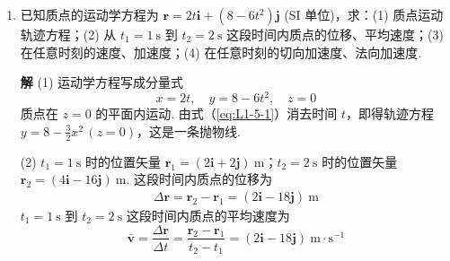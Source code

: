 \begin{enumerate}
	(3) 制动开始后 $t = 20 \mathrm{\ s}$ 时飞轮的角速度为
	\begin{equation}\label{eq:L1-4-3}
		\omega = \omega_0 + \alpha t = \left[ 50\pi + (-\pi) \times 20 \right] \mathrm{\ rad \cdot s^{-1}} = 30\pi \mathrm{\ rad \cdot s^{-1}}
	\end{equation}
	
	(4) $t = 20 \mathrm{\ s}$ 时刻飞轮边缘上任一点的速率为
	\begin{align*}
		v = R\omega = 0.60 \times 30\pi \mathrm{\ m \cdot s^{-1}} = 18\pi \mathrm{\ m \cdot s^{-1}} = 56.5 \mathrm{\ m \cdot s^{-1}}
	\end{align*}
	$t = 20 \mathrm{\ s}$ 时刻飞轮边缘上任一点的切向加速度和法向加速度分别为
	\begin{align*}
		a_t = R\alpha = 0.60 \times (-\pi) \mathrm{\ m \cdot s^{-2}} = -0.60\pi \mathrm{\ m \cdot s^{-2}} = -1.88 \mathrm{\ m \cdot s^{-2}}
	\end{align*}
	\begin{align*}
		a_n = R\omega^2 = 0.60 \times (30\pi)^2 \mathrm{\ m \cdot s^{-2}} = 5.33 \times 10^3 \mathrm{\ m \cdot s^{-2}}
	\end{align*}
	$t = 20 \mathrm{\ s}$ 时刻飞轮边缘上任一点的加速度大小为
	\begin{equation}\label{eq:L1-4-4}
		a = \sqrt{a_t^2 + a_n^2} = 5.33 \times 10^3 \mathrm{\ m \cdot s^{-2}}
	\end{equation}
	
	\vspace{2em}
	
	\item [\textbf{L1-5}]
	\setcounter{equation}{0}
	\renewcommand{\theHequation}{L1-5.\arabic{equation}}
	\quad 已知质点的运动学方程为 $\boldsymbol{r} = 2t\boldsymbol{i} + (8 - 6t^2)\boldsymbol{j}$ (SI 单位)，求：(1) 质点运动轨迹方程；(2) 从 $t_1 = 1\mathrm{\ s}$ 到 $t_2 = 2\mathrm{\ s}$ 这段时间内质点的位移、平均速度；(3) 在任意时刻的速度、加速度；(4) 在任意时刻的切向加速度、法向加速度.
	
	\textbf{解} \quad (1) 运动学方程写成分量式
	\begin{equation}\label{eq:L1-5-1}
		x = 2t, \quad y = 8 - 6t^2, \quad z = 0
	\end{equation}
	质点在 $z = 0$ 的平面内运动. 由式（\ref{eq:L1-5-1}）消去时间 $t$，即得轨迹方程 $y = 8 - \frac{3}{2}x^2 \, (z=0)$，这是一条抛物线.
	
	(2) $t_1 = 1\mathrm{\ s}$ 时的位置矢量 $\boldsymbol{r}_1 = (2\boldsymbol{i} + 2\boldsymbol{j})\mathrm{\ m}$；$t_2 = 2\mathrm{\ s}$ 时的位置矢量 $\boldsymbol{r}_2 = (4\boldsymbol{i} - 16\boldsymbol{j})\mathrm{\ m}$. 这段时间内质点的位移为
	\begin{align*}
		\Delta\boldsymbol{r} = \boldsymbol{r}_2 - \boldsymbol{r}_1 = (2\boldsymbol{i} - 18\boldsymbol{j})\mathrm{\ m}
	\end{align*}
	$t_1 = 1\mathrm{\ s}$ 到 $t_2 = 2\mathrm{\ s}$ 这段时间内质点的平均速度为
	\begin{equation}\label{eq:L1-5-2}
		\bar{\boldsymbol{v}} = \frac{\Delta\boldsymbol{r}}{\Delta t} = \frac{\boldsymbol{r}_2 - \boldsymbol{r}_1}{t_2 - t_1} = (2\boldsymbol{i} - 18\boldsymbol{j})\mathrm{\ m \cdot s^{-1}}
	\end{equation}
	

\end{enumerate}
